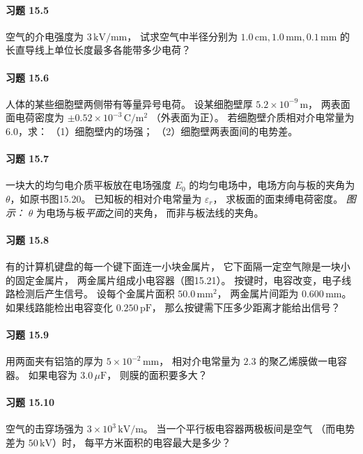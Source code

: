 \paragraph{习题 15.5}
空气的介电强度为 \(3\,\mathrm{kV/mm}\)，
试求空气中半径分别为
\(1.0\,\mathrm{cm},1.0\,\mathrm{mm},0.1\,\mathrm{mm}\)
的长直导线上单位长度最多各能带多少电荷？

\paragraph{习题 15.6}
人体的某些细胞壁两侧带有等量异号电荷。
设某细胞壁厚 \(5.2\times10^{-9}\,\mathrm m\)，
两表面面电荷密度为
\(\pm0.52\times10^{-3}\,\mathrm{C/m^2}\)
（外表面为正）。
若细胞壁介质相对介电常量为 \(6.0\)，求：
（1）细胞壁内的场强；
（2）细胞壁两表面间的电势差。

\paragraph{习题 15.7}
一块大的均匀电介质平板放在电场强度
\(E_0\) 的均匀电场中，电场方向与板的夹角为
\(\theta\)，如原书图15.20。
已知板的相对介电常量为 \(\varepsilon_r\)，
求板面的面束缚电荷密度。
\textit{图示：} \(\theta\) 为电场与板\emph{平面}之间的夹角，
而非与板法线的夹角。

\paragraph{习题 15.8}
有的计算机键盘的每一个键下面连一小块金属片，
它下面隔一定空气隙是一块小的固定金属片，
两金属片组成小电容器（图15.21）。
按键时，电容改变，电子线路检测后产生信号。
设每个金属片面积 \(50.0\,\mathrm{mm^2}\)，
两金属片间距为 \(0.600\,\mathrm{mm}\)。
如果线路能检出电容变化 \(0.250\,\mathrm{pF}\)，
那么按键需下压多少距离才能给出信号？

\paragraph{习题 15.9}
用两面夹有铝箔的厚为
\(5\times10^{-2}\,\mathrm{mm}\)，
相对介电常量为 \(2.3\) 的聚乙烯膜做一电容器。
如果电容为 \(3.0\,\mu\mathrm F\)，
则膜的面积要多大？

\paragraph{习题 15.10}
空气的击穿场强为 \(3\times10^3\,\mathrm{kV/m}\)。
当一个平行板电容器两极板间是空气
（而电势差为 \(50\,\mathrm{kV}\)）时，
每平方米面积的电容最大是多少？

